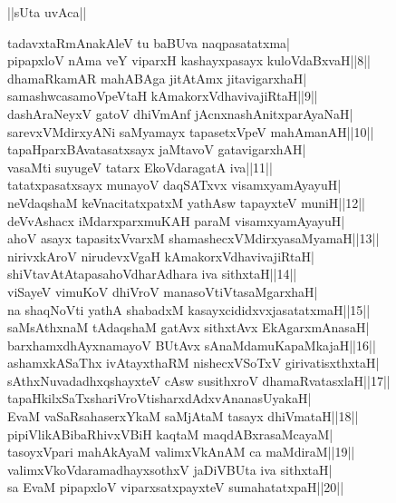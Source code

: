 \documentclass{article}
\begin{document}
\begin{center}
||sUta uvAca||
\end{center}

tadavxtaRmAnakAleV tu baBUva naqpasatatxma|\\
pipapxloV nAma veY viparxH kashayxpasayx kuloVdaBxvaH||8||\\
dhamaRkamAR mahABAga jitAtAmx jitavigarxhaH|\\
samashwcasamoVpeVtaH kAmakorxVdhavivajiRtaH||9||\\
dashAraNeyxV gatoV dhiVmAnf jAcnxnashAnitxparAyaNaH|\\
sarevxVMdirxyANi saMyamayx tapasetxVpeV mahAmanAH||10||\\
tapaHparxBAvatasatxsayx jaMtavoV gatavigarxhAH|\\
vasaMti suyugeV tatarx EkoVdaragatA iva||11||\\
tatatxpasatxsayx munayoV daqSATxvx visamxyamAyayuH|\\
neVdaqshaM keVnacitatxpatxM yathAsw tapayxteV muniH||12||\\
deVvAshacx iMdarxparxmuKAH paraM visamxyamAyayuH|\\
ahoV asayx tapasitxVvarxM shamashecxVMdirxyasaMyamaH||13||\\
nirivxkAroV nirudevxVgaH kAmakorxVdhavivajiRtaH|\\
shiVtavAtAtapasahoVdharAdhara iva sithxtaH||14||\\
viSayeV vimuKoV dhiVroV manasoVtiVtasaMgarxhaH|\\
na shaqNoVti yathA shabadxM kasayxcididxvxjasatatxmaH||15||\\
saMsAthxnaM tAdaqshaM gatAvx sithxtAvx EkAgarxmAnasaH|\\
barxhamxdhAyxnamayoV BUtAvx sAnaMdamuKapaMkajaH||16||\\
ashamxkASaThx ivAtayxthaRM nishecxVSoTxV girivatisxthxtaH|\\
sAthxNuvadadhxqshayxteV cAsw susithxroV dhamaRvatasxlaH||17||\\
tapaHkilxSaTxshariVroVtisharxdAdxvAnanasUyakaH|\\
EvaM vaSaRsahaserxYkaM saMjAtaM tasayx dhiVmataH||18||\\
pipiVlikABibaRhivxVBiH kaqtaM maqdABxrasaMcayaM|\\
tasoyxVpari mahAkAyaM valimxVkAnAM ca maMdiraM||19||\\
valimxVkoVdaramadhayxsothxV jaDiVBUta iva sithxtaH|\\
sa EvaM pipapxloV viparxsatxpayxteV sumahatatxpaH||20||\\
\end{document}
